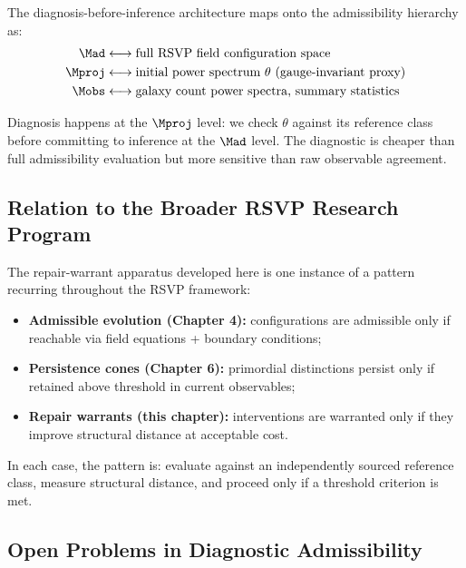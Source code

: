 The diagnosis-before-inference architecture maps onto the admissibility hierarchy as:
\begin{align*}
\Mad &\longleftrightarrow \text{full RSVP field configuration space} \\
\Mproj &\longleftrightarrow \text{initial power spectrum } \theta \text{ (gauge-invariant proxy)} \\
\Mobs &\longleftrightarrow \text{galaxy count power spectra, summary statistics}
\end{align*}

Diagnosis happens at the $\Mproj$ level: we check $\theta$ against its reference class before committing to inference at the $\Mad$ level. The diagnostic is cheaper than full admissibility evaluation but more sensitive than raw observable agreement.


\subsection{Relation to the Broader RSVP Research Program}

The repair-warrant apparatus developed here is one instance of a pattern recurring throughout the RSVP framework:
\begin{itemize}
\item \textbf{Admissible evolution (Chapter 4):} configurations are admissible only if reachable via field equations + boundary conditions;
\item \textbf{Persistence cones (Chapter 6):} primordial distinctions persist only if retained above threshold in current observables;
\item \textbf{Repair warrants (this chapter):} interventions are warranted only if they improve structural distance at acceptable cost.
\end{itemize}

In each case, the pattern is: evaluate against an independently sourced reference class, measure structural distance, and proceed only if a threshold criterion is met.


\subsection{Open Problems in Diagnostic Admissibility}

